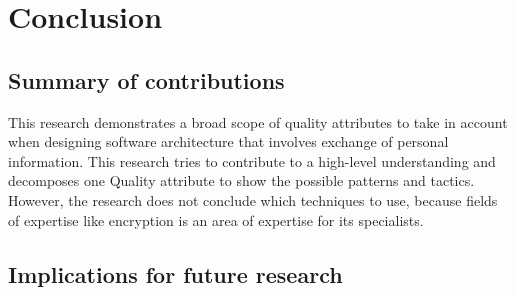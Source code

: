 \chapter{Conclusion}\label{s:conclusion}
\section{Summary of contributions}
This research demonstrates a broad scope of quality attributes to take in account when designing software architecture that involves exchange of personal information. This research tries to contribute to a high-level understanding and decomposes one Quality attribute to show the possible patterns and tactics. However, the research does not conclude which techniques to use, because fields of expertise like encryption is an area of expertise for its specialists.

\section{Implications for future research}
\lipsum[1-1]

